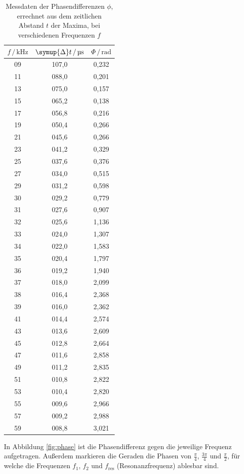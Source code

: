 \begin{table}
  \centering
  \caption{Messdaten der Phasendifferenzen $\phi$, errechnet aus dem zeitlichen Abstand $t$ der Maxima, bei verschiedenen Frequenzen $f$}
  \label{tab:Messdaten3}
  \begin{tabular}{c c c}
  \toprule
  $f \,/\, \si{\kilo\hertz}$ & $\symup{\Delta} t \,/\, \si{\micro\second}$ & $\Phi \,/\, \si{\radian}$ \\
  \midrule
09 & 107,0 & 0,232 \\
11 & 088,0 & 0,201 \\
13 & 075,0 & 0,157 \\
15 & 065,2 & 0,138 \\
17 & 056,8 & 0,216 \\
19 & 050,4 & 0,266 \\
21 & 045,6 & 0,266 \\
23 & 041,2 & 0,329 \\
25 & 037,6 & 0,376 \\
27 & 034,0 & 0,515 \\
29 & 031,2 & 0,598 \\
30 & 029,2 & 0,779 \\
31 & 027,6 & 0,907 \\
32 & 025,6 & 1,136 \\
33 & 024,0 & 1,307 \\
34 & 022,0 & 1,583 \\
35 & 020,4 & 1,797 \\
36 & 019,2 & 1,940 \\
37 & 018,0 & 2,099 \\
38 & 016,4 & 2,368 \\
39 & 016,0 & 2,362 \\
41 & 014,4 & 2,574 \\
43 & 013,6 & 2,609 \\
45 & 012,8 & 2,664 \\
47 & 011,6 & 2,858 \\
49 & 011,2 & 2,835 \\
51 & 010,8 & 2,822 \\
53 & 010,4 & 2,820 \\
55 & 009,6 & 2,966 \\
57 & 009,2 & 2,988 \\
59 & 008,8 & 3,021 \\
  \bottomrule
  \end{tabular}
  \end{table} 

  In Abbildung \ref{fig:phase} ist die Phasendifferenz gegen die jeweilige Frequenz 
  aufgetragen. Außerdem markieren die Geraden die Phasen von
  $\frac{\pi}{4}$, $\frac{3 \pi}{4}$ und $\frac{\pi}{2}$, für welche die Frequenzen 
  $f_1$, $f_2$ und $f_\text{res}$ (Resonanzfrequenz)
  ablesbar sind.

